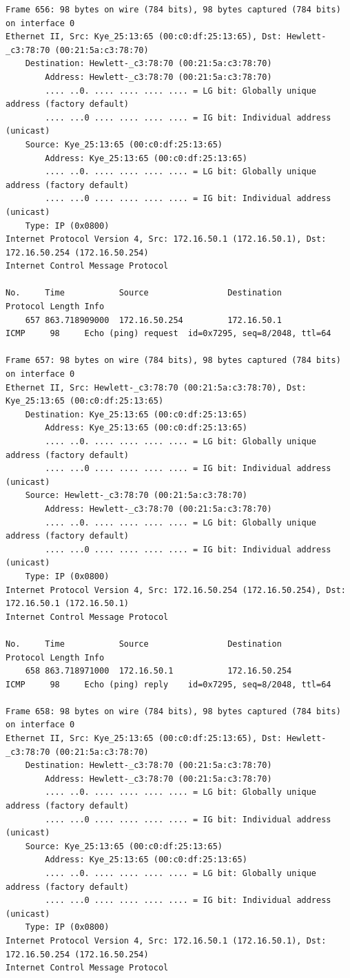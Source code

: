 \documentclass[a4paper,11pt]{article}
\begin{document}
\begin{lstlisting}
Frame 656: 98 bytes on wire (784 bits), 98 bytes captured (784 bits) on interface 0
Ethernet II, Src: Kye_25:13:65 (00:c0:df:25:13:65), Dst: Hewlett-_c3:78:70 (00:21:5a:c3:78:70)
    Destination: Hewlett-_c3:78:70 (00:21:5a:c3:78:70)
        Address: Hewlett-_c3:78:70 (00:21:5a:c3:78:70)
        .... ..0. .... .... .... .... = LG bit: Globally unique address (factory default)
        .... ...0 .... .... .... .... = IG bit: Individual address (unicast)
    Source: Kye_25:13:65 (00:c0:df:25:13:65)
        Address: Kye_25:13:65 (00:c0:df:25:13:65)
        .... ..0. .... .... .... .... = LG bit: Globally unique address (factory default)
        .... ...0 .... .... .... .... = IG bit: Individual address (unicast)
    Type: IP (0x0800)
Internet Protocol Version 4, Src: 172.16.50.1 (172.16.50.1), Dst: 172.16.50.254 (172.16.50.254)
Internet Control Message Protocol

No.     Time           Source                Destination           Protocol Length Info
    657 863.718909000  172.16.50.254         172.16.50.1           ICMP     98     Echo (ping) request  id=0x7295, seq=8/2048, ttl=64

Frame 657: 98 bytes on wire (784 bits), 98 bytes captured (784 bits) on interface 0
Ethernet II, Src: Hewlett-_c3:78:70 (00:21:5a:c3:78:70), Dst: Kye_25:13:65 (00:c0:df:25:13:65)
    Destination: Kye_25:13:65 (00:c0:df:25:13:65)
        Address: Kye_25:13:65 (00:c0:df:25:13:65)
        .... ..0. .... .... .... .... = LG bit: Globally unique address (factory default)
        .... ...0 .... .... .... .... = IG bit: Individual address (unicast)
    Source: Hewlett-_c3:78:70 (00:21:5a:c3:78:70)
        Address: Hewlett-_c3:78:70 (00:21:5a:c3:78:70)
        .... ..0. .... .... .... .... = LG bit: Globally unique address (factory default)
        .... ...0 .... .... .... .... = IG bit: Individual address (unicast)
    Type: IP (0x0800)
Internet Protocol Version 4, Src: 172.16.50.254 (172.16.50.254), Dst: 172.16.50.1 (172.16.50.1)
Internet Control Message Protocol

No.     Time           Source                Destination           Protocol Length Info
    658 863.718971000  172.16.50.1           172.16.50.254         ICMP     98     Echo (ping) reply    id=0x7295, seq=8/2048, ttl=64

Frame 658: 98 bytes on wire (784 bits), 98 bytes captured (784 bits) on interface 0
Ethernet II, Src: Kye_25:13:65 (00:c0:df:25:13:65), Dst: Hewlett-_c3:78:70 (00:21:5a:c3:78:70)
    Destination: Hewlett-_c3:78:70 (00:21:5a:c3:78:70)
        Address: Hewlett-_c3:78:70 (00:21:5a:c3:78:70)
        .... ..0. .... .... .... .... = LG bit: Globally unique address (factory default)
        .... ...0 .... .... .... .... = IG bit: Individual address (unicast)
    Source: Kye_25:13:65 (00:c0:df:25:13:65)
        Address: Kye_25:13:65 (00:c0:df:25:13:65)
        .... ..0. .... .... .... .... = LG bit: Globally unique address (factory default)
        .... ...0 .... .... .... .... = IG bit: Individual address (unicast)
    Type: IP (0x0800)
Internet Protocol Version 4, Src: 172.16.50.1 (172.16.50.1), Dst: 172.16.50.254 (172.16.50.254)
Internet Control Message Protocol


\end{lstlisting}
\end{document}
